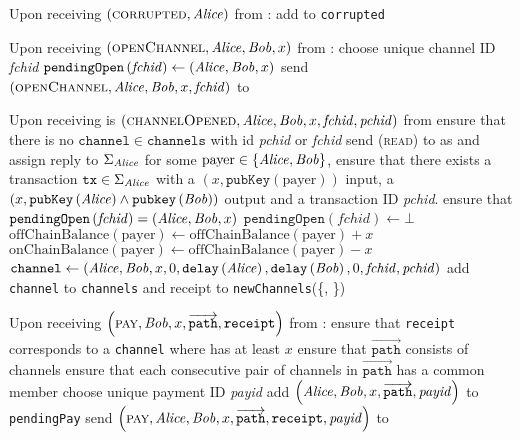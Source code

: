 \begin{functionality}{\fpaynet}
\begin{algorithmic}[1]
    \State Upon receiving $\left(\textsc{corrupted}, \mathit{Alice}\right)$ from
    \simulator:
    \Indent
      \State add \alice{} to \texttt{corrupted}
    \EndIndent
    \State

    \State Upon receiving $\left(\textsc{openChannel}, \mathit{Alice}, \mathit{Bob}, x\right)$
    from \alice:
    \Indent
      \State choose unique channel ID \textit{fchid}
      \State $\mathtt{pendingOpen}\left(\mathit{fchid}\right) \gets
      \left(\mathit{Alice}, \mathit{Bob}, x\right)$
      \State send $\left(\textsc{openChannel}, \mathit{Alice}, \mathit{Bob}, x,
      \mathit{fchid}\right)$ to \simulator
    \EndIndent
    \State

    \State Upon receiving is $\left(\textsc{channelOpened}, \mathit{Alice}, \mathit{Bob}, x,
    \mathit{fchid}, \mathit{pchid}\right)$ from \simulator
    \Indent
      \State ensure that there is no $\mathtt{channel} \in \mathtt{channels}$
      with id \textit{pchid} or \textit{fchid}
      \State send (\textsc{read}) to \ledger{} as \alice{} and assign reply to
      $\Sigma_{\mathit{Alice}}$
      \State for some $\mathrm{payer} \in \left\{\mathit{Alice}, \mathit{Bob}\right\}$, ensure
      that there exists a transaction $\mathtt{tx} \in \Sigma_{\mathit{Alice}}$ with a
      $\left(x, \mathtt{pubKey}\left(\mathrm{payer}\right)\right)$ input, a
      $\left(x, \mathtt{pubKey}\left(\mathit{Alice}\right) \wedge
      \mathtt{pubkey}\left(\mathit{Bob}\right)\right)$ output and a transaction ID
      \textit{pchid}.
       
        \State ensure that $\mathtt{pendingOpen}\left(\mathit{fchid}\right)
        = \left(\mathit{Alice}, \mathit{Bob}, x\right)$
        \State $\mathtt{pendingOpen}\left(\mathit{fchid}\right) \gets \bot$
      \EndIf
      \State $\mathrm{offChainBalance}\left(\mathrm{payer}\right) \gets
      \mathrm{offChainBalance}\left(\mathrm{payer}\right) + x$ 
      \State $\mathrm{onChainBalance}\left(\mathrm{payer}\right) \gets
      \mathrm{offChainBalance}\left(\mathrm{payer}\right) - x$
      \State $\mathtt{channel} \gets \left(\mathit{Alice}, \mathit{Bob}, x, 0,
      \mathtt{delay}\left(\mathit{Alice}\right), \mathtt{delay}\left(\mathit{Bob}\right), 0,
      \mathit{fchid}, \mathit{pchid}\right)$
      \State add \texttt{channel} to \texttt{channels} and receipt to
      \texttt{newChannels}(\{\alice, \bob\})
    \EndIndent
    \State

    \State Upon receiving $\left(\textsc{pay}, \mathit{Bob}, x,
    \overrightarrow{\mathtt{path}}, \mathtt{receipt}\right)$ from \alice:
    \Indent
      \State ensure that \texttt{receipt} corresponds to a \texttt{channel}
      where \alice{} has at least $x$
      \State ensure that $\overrightarrow{\mathtt{path}}$ consists of channels
      \State ensure that each consecutive pair of channels in
      $\overrightarrow{\mathtt{path}}$ has a common member
      \State choose unique payment ID \textit{payid}
      \State add $\left(\mathit{Alice}, \mathit{Bob}, x, \overrightarrow{\mathtt{path}},
      \mathit{payid}\right)$ to \texttt{pendingPay}
      \State send $\left(\textsc{pay}, \mathit{Alice}, \mathit{Bob}, x,
      \overrightarrow{\mathtt{path}}, \mathtt{receipt}, \mathit{payid}\right)$
      to \simulator
    \EndIndent
    \State


\end{algorithmic}
\end{functionality}
